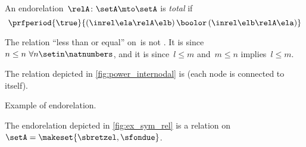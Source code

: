 \begin{ctdefinition}
    \label{def:endo_total}
    An endorelation~$\relA\colon \setA\mto \setA$ is \emph{total} if
    \begin{equation}\label{eq:total}
        \prfperiod{
            \true
        }{
            (\inrel\ela\relA\elb )\,\boolor\, (\inrel\elb\relA\ela)
        }
    \end{equation}
\end{ctdefinition}

\begin{example}
    The relation ``less than or equal'' on~\natnumbers  is not .
    It is  since~$n\leq n \ \forall n\setin \natnumbers$, and it is  since~$l\leq m$ and~$m\leq n$ implies~$l\leq m$.
\end{example}

\begin{example}
    The relation depicted in \vref{fig:power_internodal} is  (each node is connected to itself).
\end{example}
\begin{marginfigure}
    \centering
    \caption{Example of  endorelation.}
    \label{fig:ex_sym_rel}
\end{marginfigure}
\begin{example}
    The endorelation depicted in \vref{fig:ex_sym_rel} is a  relation on~$\setA=\makeset{\sbretzel,\sfondue}$.
\end{example}

